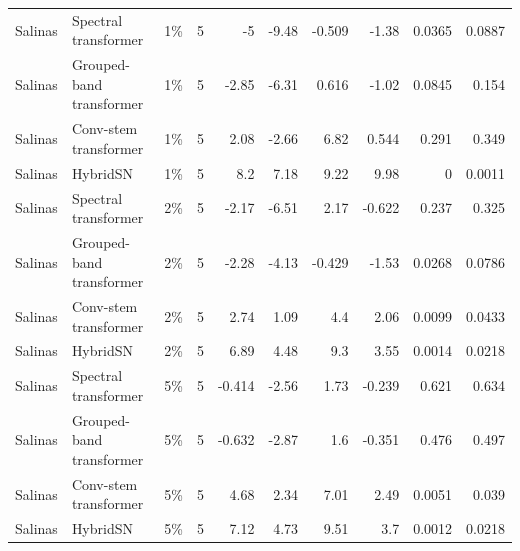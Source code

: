 \begin{table}
\begin{tabular}{lllrrrrrrr}
Salinas & Spectral transformer & 1\% & 5 & -5 & -9.48 & -0.509 & -1.38 & 0.0365 & 0.0887 \\
Salinas & Grouped-band transformer & 1\% & 5 & -2.85 & -6.31 & 0.616 & -1.02 & 0.0845 & 0.154 \\
Salinas & Conv-stem transformer & 1\% & 5 & 2.08 & -2.66 & 6.82 & 0.544 & 0.291 & 0.349 \\
Salinas & HybridSN & 1\% & 5 & 8.2 & 7.18 & 9.22 & 9.98 & 0 & 0.0011 \\
Salinas & Spectral transformer & 2\% & 5 & -2.17 & -6.51 & 2.17 & -0.622 & 0.237 & 0.325 \\
Salinas & Grouped-band transformer & 2\% & 5 & -2.28 & -4.13 & -0.429 & -1.53 & 0.0268 & 0.0786 \\
Salinas & Conv-stem transformer & 2\% & 5 & 2.74 & 1.09 & 4.4 & 2.06 & 0.0099 & 0.0433 \\
Salinas & HybridSN & 2\% & 5 & 6.89 & 4.48 & 9.3 & 3.55 & 0.0014 & 0.0218 \\
Salinas & Spectral transformer & 5\% & 5 & -0.414 & -2.56 & 1.73 & -0.239 & 0.621 & 0.634 \\
Salinas & Grouped-band transformer & 5\% & 5 & -0.632 & -2.87 & 1.6 & -0.351 & 0.476 & 0.497 \\
Salinas & Conv-stem transformer & 5\% & 5 & 4.68 & 2.34 & 7.01 & 2.49 & 0.0051 & 0.039 \\
Salinas & HybridSN & 5\% & 5 & 7.12 & 4.73 & 9.51 & 3.7 & 0.0012 & 0.0218 \\
\bottomrule
\end{tabular}
\end{table}
